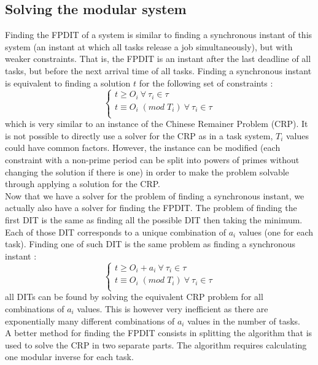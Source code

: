 \documentclass[times, 10pt,twocolumn, a4paper]{article}
\begin{document}
	\subsection{Solving the modular system}
		Finding the FPDIT of a system is similar to finding a synchronous instant of
		this system (an instant at which all tasks release a job simultaneously), but
		with weaker constraints. That is, the FPDIT is an instant after the last
		deadline of all tasks, but before the next arrival time of all tasks. Finding
		a synchronous instant is equivalent to finding a solution $t$ for the
		following set of constraints :
		\[
			\left\{
			\begin{array}{l}
				t \geqslant O_i \: \forall \: \tau_i \in \tau \\
				t \equiv O_i \; (mod \; T_i) \: \forall \: \tau_i \in \tau \\
			\end{array}
			\right.
		\]
		which is very similar to an instance of the Chinese Remainer Problem (CRP). It
		is not possible to directly use a solver for the CRP as in a task system,
		$T_i$ values could have common factors. However, the instance can be modified
		(each constraint with a non-prime period can be split into powers of primes
		without changing the solution if there is one) in order to make the problem
		solvable through applying a solution for the CRP. \\

		Now that we have a solver for the problem of finding a synchronous instant, we
		actually also have a solver for finding the FPDIT. The problem of finding the
		first DIT is the same as finding all the possible DIT then taking the minimum.
		Each of those DIT corresponds to a unique combination of $a_i$ values (one
		for each task). Finding one of such DIT is the same problem as finding a
		synchronous instant :
		\[
			\left\{
			\begin{array}{l}
				t \geqslant O_i + a_i \: \forall \: \tau_i \in \tau \\
				t \equiv O_i \; (mod \; T_i) \: \forall \: \tau_i \in \tau \\
			\end{array}
			\right.
		\]
		all DITs can be found by solving the equivalent CRP problem for all
		combinations of $a_i$ values. This is however very inefficient as there are
		exponentially many different combinations of $a_i$ values in the number of
		tasks.\\

		A better method for finding the FPDIT consists in splitting the algorithm that
		is used to solve the CRP in two separate parts. The algorithm requires
		calculating one modular inverse for each task. %
\end{document}
